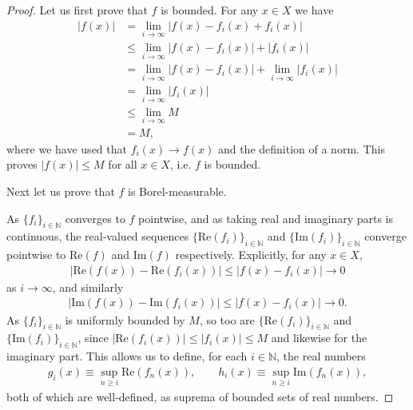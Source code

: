 \begin{proof}
    \leanok
Let us first prove that $f$ is bounded. For any $x \in X$ we have
\begin{align}
    \lvert f(x) \rvert &= \lim\limits_{i \rightarrow \infty} \lvert f(x) - f_i(x) + f_i(x) \rvert \\
                        &\le \lim\limits_{i \rightarrow \infty} \lvert f(x) - f_i(x) \rvert + \lvert f_i(x) \rvert \\
                        &=   \lim\limits_{i \rightarrow \infty} \lvert f(x) - f_i(x) \rvert + \lim\limits_{i \rightarrow \infty} \lvert f_i(x) \rvert \\
                        &=   \lim\limits_{i \rightarrow \infty} \lvert f_i(x) \rvert \\
                        &\le \lim\limits_{i \rightarrow \infty} M \\
                        &=   M,
\end{align}
where we have used that $f_i(x) \rightarrow f(x)$ and the definition of a norm. This proves $\lvert f(x) \rvert \le M$ for all $x \in X$, i.e. $f$ is bounded.

Next let us prove that $f$ is Borel-measurable.

As $\{ f_i \}_{i \in \mathbb{N}}$ converges to $f$ pointwise, and as taking real and imaginary parts is continuous, the real-valued sequences $\{ \text{Re}(f_i) \}_{i \in \mathbb{N}}$ and $\{ \text{Im}(f_i) \}_{i \in \mathbb{N}}$ converge pointwise to $\text{Re}(f)$ and $\text{Im}(f)$ respectively. Explicitly, for any $x \in X$,
\begin{align}
    \lvert \text{Re}(f(x)) - \text{Re}(f_i(x)) \rvert \le \lvert f(x) - f_i(x) \rvert \rightarrow 0
\end{align}
as $i \rightarrow \infty$, and similarly
\begin{align}
    \lvert \text{Im}(f(x)) - \text{Im}(f_i(x)) \rvert \le \lvert f(x) - f_i(x) \rvert \rightarrow 0.
\end{align}
As $\{ f_i \}_{i \in \mathbb{N}}$ is uniformly bounded by $M$, so too are $\{ \text{Re}(f_i) \}_{i \in \mathbb{N}}$ and $\{ \text{Im}(f_i) \}_{i \in \mathbb{N}}$, since $\lvert \text{Re}(f_i(x)) \rvert \le \lvert f_i(x) \rvert \le M$ and likewise for the imaginary part. This allows us to define, for each $i \in \mathbb{N}$, the real numbers
\begin{align}
    g_i(x) \equiv \sup\limits_{n \ge i} \text{Re}(f_n(x)), \qquad h_i(x) \equiv \sup\limits_{n \ge i} \text{Im}(f_n(x)),
\end{align}
both of which are well-defined, as suprema of bounded sets of real numbers.


\end{proof}
